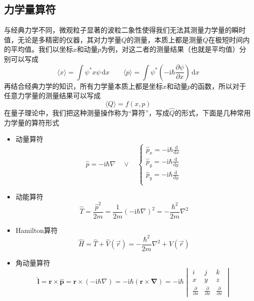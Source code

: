 \subsection{力学量算符}
与经典力学不同，微观粒子显著的波粒二象性使得我们无法其测量力学量的瞬时值，无论是多精密的仪器，其对力学量$Q$的测量，本质上都是测量$Q$在极短时间内的平均值。我们以坐标$x$和动量$p$为例，对这二者的测量结果（也就是平均值）分别可以写成
$$
    \langle x \rangle = \int\psi^*x\psi\,\mathrm{d}x
    \quad \quad
    \langle p \rangle = \int\psi^*\left(-\mathrm{i}\hbar\frac{\partial \psi}{\partial x}\right)\,\mathrm{d}x
$$
再结合经典力学的知识，所有力学量本质上都是坐标$x$和动量$p$的函数，所以对于任意力学量的测量结果可以写成
$$
    \langle{Q}\rangle=f\left(x, p\right)
$$
在量子理论中，我们把这种测量操作称为“算符”，写成$\hat{Q}$的形式，下面是几种常用力学量的算符形式
\begin{itemize}
    \item 动量算符
          $$
              \hat{p}=-\mathrm{i}\hbar\nabla
              \quad
              \lor
              \quad
              \begin{cases}
                  \hat{p}_x=-\mathrm{i}\hbar\frac{\mathrm{d}}{\mathrm{d}x} \\
                  \hat{p}_y=-\mathrm{i}\hbar\frac{\mathrm{d}}{\mathrm{d}y} \\
                  \hat{p}_y=-\mathrm{i}\hbar\frac{\mathrm{d}}{\mathrm{d}y} \\
              \end{cases}
          $$
    \item 动能算符
          $$
              \hat{T}=\frac{\hat{p}^2}{2m}
              =\frac{1}{2m}\left(-\mathrm{i}\hbar\nabla\right)^2
              =-\frac{\hbar^2}{2m}\nabla^2
          $$
    \item Hamilton算符
          $$
              \hat{H}=\hat{T}+\hat{V}(\vec{r})=-\frac{\hbar^2}{2m}\nabla^2+V(\vec{r})
          $$
    \item 角动量算符
          $$
              \hat{\boldsymbol{l}}
              = \boldsymbol{r} \times \hat{\boldsymbol{p}}
              = \boldsymbol{r} \times (-\mathrm{i}\hbar\nabla)
              = -\mathrm{i}\hbar\left(\boldsymbol{r\times\nabla}\right)
              =-\mathrm{i}\hbar\begin{vmatrix}
                  i                           & j                           & k                           \\
                  x                           & y                           & z                           \\
                  \frac{\partial}{\partial x} & \frac{\partial}{\partial x} & \frac{\partial}{\partial x}
              \end{vmatrix}
          $$
\end{itemize}









